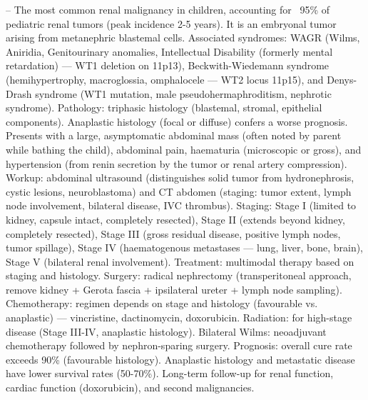 -- The most common renal malignancy in children, accounting for ~95\% of pediatric renal tumors (peak incidence 2-5 years). It is an embryonal tumor arising from metanephric blastemal cells. Associated syndromes: WAGR (Wilms, Aniridia, Genitourinary anomalies, Intellectual Disability (formerly mental retardation) — WT1 deletion on 11p13), Beckwith-Wiedemann syndrome (hemihypertrophy, macroglossia, omphalocele — WT2 locus 11p15), and Denys-Drash syndrome (WT1 mutation, male pseudohermaphroditism, nephrotic syndrome). Pathology: triphasic histology (blastemal, stromal, epithelial components). Anaplastic histology (focal or diffuse) confers a worse prognosis. Presents with a large, asymptomatic abdominal mass (often noted by parent while bathing the child), abdominal pain, haematuria (microscopic or gross), and hypertension (from renin secretion by the tumor or renal artery compression). Workup: abdominal ultrasound (distinguishes solid tumor from hydronephrosis, cystic lesions, neuroblastoma) and CT abdomen (staging: tumor extent, lymph node involvement, bilateral disease, IVC thrombus). Staging: Stage I (limited to kidney, capsule intact, completely resected), Stage II (extends beyond kidney, completely resected), Stage III (gross residual disease, positive lymph nodes, tumor spillage), Stage IV (haematogenous metastases — lung, liver, bone, brain), Stage V (bilateral renal involvement). Treatment: multimodal therapy based on staging and histology. Surgery: radical nephrectomy (transperitoneal approach, remove kidney + Gerota fascia + ipsilateral ureter + lymph node sampling). Chemotherapy: regimen depends on stage and histology (favourable vs. anaplastic) — vincristine, dactinomycin, doxorubicin. Radiation: for high-stage disease (Stage III-IV, anaplastic histology). Bilateral Wilms: neoadjuvant chemotherapy followed by nephron-sparing surgery. Prognosis: overall cure rate exceeds 90\% (favourable histology). Anaplastic histology and metastatic disease have lower survival rates (50-70\%). Long-term follow-up for renal function, cardiac function (doxorubicin), and second malignancies.
